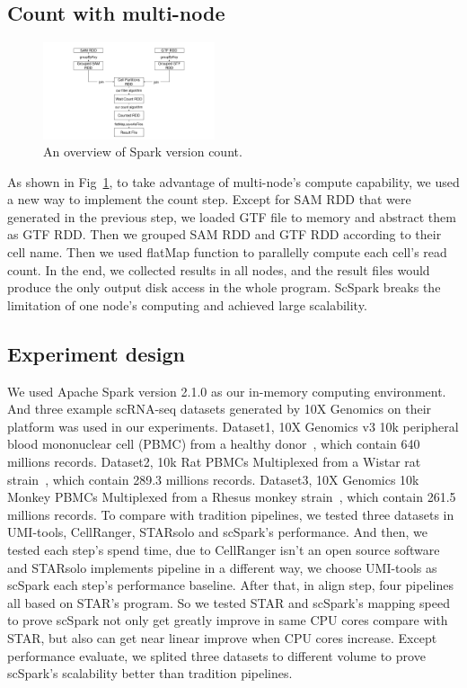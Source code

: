 \documentclass[10pt,journal,compsoc]{IEEEtran}
\begin{document}
\subsection{Count with multi-node}
\begin{figure}
	\includegraphics[width=0.45\textwidth]{fig3.pdf}
	\caption{An overview of Spark version count.} \label{fig3}
\end{figure}
As shown in Fig~\ref{fig3}, to take advantage of multi-node's compute capability, we used a new way to implement the count step. 
Except for SAM RDD that were generated in the previous step, we loaded GTF file to memory and abstract them as GTF RDD. 
Then we grouped SAM RDD and GTF RDD according to their cell name. 
Then we used flatMap function to parallelly compute each cell's read count. 
In the end, we collected results in all nodes, and the result files would produce the only output disk access in the whole program. 
ScSpark breaks the limitation of one node's computing and achieved large scalability. 

\subsection{Experiment design}
We used Apache Spark version 2.1.0 as our in-memory computing environment.
And three example scRNA-seq datasets generated by 10X Genomics on their platform was used in our experiments.
Dataset1, 10X Genomics v3 10k peripheral blood mononuclear cell (PBMC) from a healthy donor~\cite{ref_url4}, which contain 640 millions records.
Dataset2, 10k Rat PBMCs Multiplexed from a  Wistar rat strain~\cite{ref_url7}, which contain 289.3 millions records.
Dataset3, 10X Genomics 10k Monkey PBMCs Multiplexed from a Rhesus monkey strain~\cite{ref_url8}, which contain 261.5 millions records.
To compare with tradition pipelines, we tested three datasets in UMI-tools, CellRanger, STARsolo and scSpark's performance.
And then, we tested each step's spend time, due to CellRanger isn't an open source software and STARsolo implements pipeline in a different way, we choose UMI-tools as scSpark each step's performance baseline.
After that, in align step, four pipelines all based on STAR's program.
So we tested STAR and scSpark's mapping speed to prove scSpark not only get greatly improve in same CPU cores compare with STAR, but also can get near linear improve when CPU cores increase.
Except performance evaluate, we splited three datasets to different volume to prove scSpark's scalability better than tradition pipelines.
\end{document}
